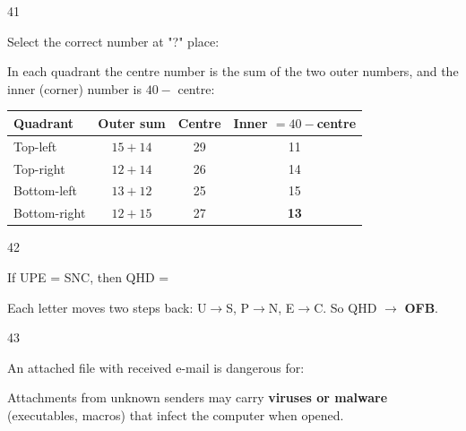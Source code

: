 \begin{question}{41}
{Select the correct number at "?" place:\par}
\begin{explain}
In each quadrant the centre number is the sum of the two outer numbers, and the inner (corner) number is $40-$ centre:
\begin{center}\small
\begin{tabular}{lccc}\toprule Quadrant & Outer sum & Centre & Inner $=40-$centre\\\midrule
Top-left & $15+14$ & 29 & 11\\ Top-right & $12+14$ & 26 & 14\\ Bottom-left & $13+12$ & 25 & 15\\ Bottom-right & $12+15$ & 27 & \textbf{13}\\\bottomrule
\end{tabular}
\end{center}
\end{explain}
\end{question}

\begin{question}{42}
{If UPE = SNC, then QHD = \blank{}\par}
\begin{explain}
Each letter moves two steps back: U$\rightarrow$S, P$\rightarrow$N, E$\rightarrow$C. So QHD $\rightarrow$ \textbf{OFB}.
\end{explain}
\end{question}

\begin{question}{43}
{An attached file with received e-mail is dangerous for:\par}
\begin{explain}
Attachments from unknown senders may carry \textbf{viruses or malware} (executables, macros) that infect the computer when opened.
\end{explain}
\end{question}

